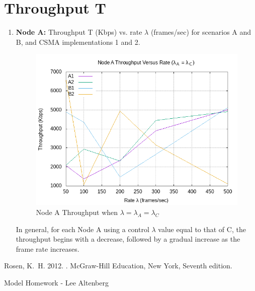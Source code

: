 \documentclass[11pt]{article}
\begin{document}
\section{Throughput T}
\begin{enumerate}
\item {\bf Node A:} Throughput T (Kbps) vs. rate \(\lambda{}\) (frames/sec) for scenarios A and B, and CSMA
implementations 1 and 2.

\begin{figure}[htp]
    \centering
    \includegraphics[width=5in]{1A.png}
    \caption{Node A Throughput when \(\lambda{} = \lambda{}_A = \lambda{}_C\) }
    \label{fig:1A}
\end{figure}

In general, for each Node A using a control \(\lambda{}\) value equal to that of C, the throughput begins with a decrease, followed by a gradual increase as the frame rate increases.

\end{enumerate}


\begin{thebibliography}{}

Rosen, K.~H. 2012.
.
\newblock McGraw-Hill Education, New York, {Seventh} edition.

Model Homework - Lee Altenberg

\end{thebibliography}
\end{document}
